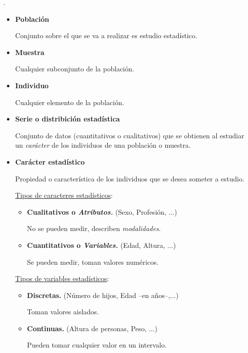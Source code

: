 \begin{definition}
.	

\begin{itemize}
	\item \textbf{Población}
	
	\hspace {1cm} Conjunto sobre el que se va a realizar es estudio estadístico.
	
	\item \textbf{Muestra}
	
	\hspace {1 cm} Cualquier subconjunto de la población.	
	
	\item \textbf{Individuo}
	
	\hspace {1 cm} Cualquier elemento de la población.
	
	\item \textbf{Serie o distribición estadística}
	
	\hspace {1 cm} Conjunto de datos (cuantitativos o cualitativos) que se obtienen al estudiar un \emph{carácter} de los individuos de una población o muestra.
	
	\item \textbf{Carácter estadístico} 
	
	\hspace {1 cm} Propiedad o característica de los individuos que se desea someter a estudio.
	
	\underline{Tipos de caracteres estadísticos}:
	
	\begin{itemize}
	\item \textbf{Cualitativos o \emph{Atributos.}} (Sexo, Profesión, ...)
	
	\hspace{1 cm} No se pueden medir, describen \emph{modalidades}.
	
	\item \textbf{Cuantitativos o \emph{Variables.}} (Edad, Altura, ...)
	
	\hspace{1 cm} Se pueden medir, toman valores numéricos.
	\end{itemize}
	
	\underline{Tipos de variables estadísticos}:
	
	\begin{itemize}
	\item \textbf{Discretas.} (Número de hijos, Edad --en años--,...)
	
	\hspace{1 cm} Toman valores aislados.
	
	\item \textbf{Continuas.} (Altura de personas, Peso, ...)
	
	\hspace{1 cm} Pueden tomar cualquier valor en un intervalo.
	\end{itemize}
	
\end{itemize}
\end{definition}

